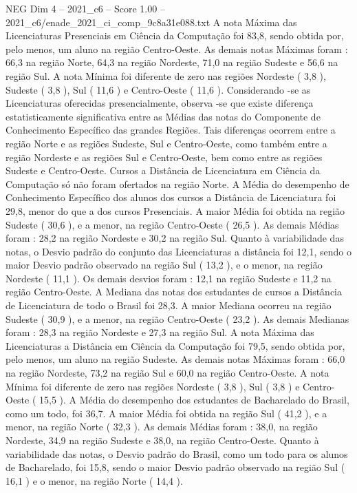 \begin{textsample}{NEG Dim 4 – 2021\_c6 – Score 1.00 – 2021\_c6/enade\_2021\_ci\_comp\_9c8a31e088.txt}
A nota Máxima das Licenciaturas Presenciais em Ciência da Computação foi 83,8, sendo obtida por, pelo menos, um aluno na região Centro-Oeste.
As demais notas Máximas foram : 66,3 na região Norte, 64,3 na região Nordeste, 71,0 na região Sudeste e 56,6 na região Sul.
A nota Mínima foi diferente de zero nas regiões Nordeste ( 3,8 ), Sudeste ( 3,8 ), Sul ( 11,6 ) e Centro-Oeste ( 11,6 ).
Considerando -se as Licenciaturas oferecidas presencialmente, observa -se que existe diferença estatisticamente significativa entre as Médias das notas do Componente de Conhecimento Específico das grandes Regiões.
Tais diferenças ocorrem entre a região Norte e as regiões Sudeste, Sul e Centro-Oeste, como também entre a região Nordeste e as regiões Sul e Centro-Oeste, bem como entre as regiões Sudeste e Centro-Oeste.
Cursos a Distância de Licenciatura em Ciência da Computação só não foram ofertados na região Norte.
A Média do desempenho de Conhecimento Específico dos alunos dos cursos a Distância de Licenciatura foi 29,8, menor do que a dos cursos Presenciais.
A maior Média foi obtida na região Sudeste ( 30,6 ), e a menor, na região Centro-Oeste ( 26,5 ).
As demais Médias foram : 28,2 na região Nordeste e 30,2 na região Sul.
Quanto à variabilidade das notas, o Desvio padrão do conjunto das Licenciaturas a distância foi 12,1, sendo o maior Desvio padrão observado na região Sul ( 13,2 ), e o menor, na região Nordeste ( 11,1 ).
Os demais desvios foram : 12,1 na região Sudeste e 11,2 na região Centro-Oeste.
A Mediana das notas dos estudantes de cursos a Distância de Licenciatura de todo o Brasil foi 28,3.
A maior Mediana ocorreu na região Sudeste ( 30,9 ), e a menor, na região Centro-Oeste ( 23,2 ).
As demais Medianas foram : 28,3 na região Nordeste e 27,3 na região Sul.
A nota Máxima das Licenciaturas a Distância em Ciência da Computação foi 79,5, sendo obtida por, pelo menos, um aluno na região Sudeste.
As demais notas Máximas foram : 66,0 na região Nordeste, 73,2 na região Sul e 60,0 na região Centro-Oeste.
A nota Mínima foi diferente de zero nas regiões Nordeste ( 3,8 ), Sul ( 3,8 ) e Centro-Oeste ( 15,5 ).
A Média do desempenho dos estudantes de Bacharelado do Brasil, como um todo, foi 36,7.
A maior Média foi obtida na região Sul ( 41,2 ), e a menor, na região Norte ( 32,3 ).
As demais Médias foram : 38,0, na região Nordeste, 34,9 na região Sudeste e 38,0, na região Centro-Oeste.
Quanto à variabilidade das notas, o Desvio padrão do Brasil, como um todo para os alunos de Bacharelado, foi 15,8, sendo o maior Desvio padrão observado na região Sul ( 16,1 ) e o menor, na região Norte ( 14,4 ).

\end{textsample}
